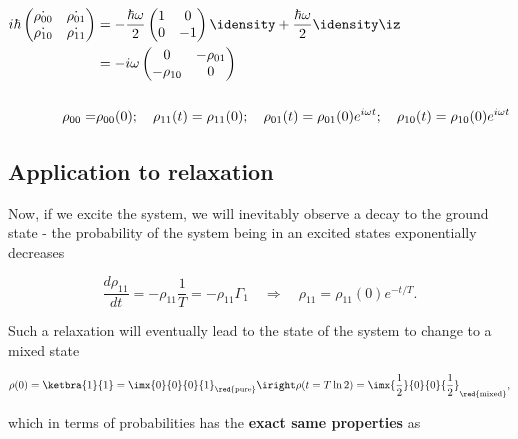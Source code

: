 \begin{itemize}
 	\begin{equation}\label{key}
 	\begin{aligned}
 		i\hbar
 			\begin{pmatrix}
	 			\dot{\rho_{00}} & \dot{\rho_{01}}\\\dot{\rho_{10}}&\dot{\rho_{11}} 
	 		\end{pmatrix} 
	 	& = -\frac{\hbar\omega}{2}
	 		\begin{pmatrix}
	 			1 & 0\\0&-1
	 		\end{pmatrix}
	 		\idensity + \frac{\hbar\omega}{2}\idensity\iz \\
	 	& = {-i\omega}{}
	 		\begin{pmatrix}
	 			0 & -\rho_{01}\\-\rho_{10}&0
	 		\end{pmatrix}\\\\
	 	\rho_{00} = &\rho_{00}(0);\quad\rho_{11}(t) = \rho_{11}(0);\quad\rho_{01}(t) = \rho_{01}(0)e^{i\omega t};\quad\rho_{10}(t) = \rho_{10}(0)e^{i\omega t}
 	\end{aligned}
 	\end{equation} 
 \end{itemize}

 \subsection{Application to relaxation} 
  Now, if we excite the system, we will inevitably observe a decay to the ground state - the probability of the system being in an excited states exponentially decreases
 
 \begin{equation}\label{relaxationRaw}
 	 \frac{d\rho_{11}}{dt}=-\rho_{11}\frac{1}{T} =  -\rho_{11}\Gamma_1\quad\Rightarrow\quad\rho_{11} = \rho_{11}(0)e^{-t/T}.
 \end{equation}
 
 \noindent Such a relaxation will eventually lead to the state of the system to change to a mixed state
 
 \begin{equation}\label{relax2}
 	\rho(0) = \ketbra{1}{1} = \imx{0}{0}{0}{1}_{\red{\text{pure}}} \iright \rho(t=T\ln2) =\imx{\frac{1}{2}}{0}{0}{\frac{1}{2}}_{\red{\text{mixed}}},
 \end{equation}
 
 \noindent which in terms of probabilities has the \textbf{exact same properties} as
 
